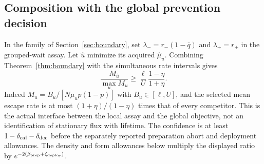 \documentclass[11pt,a4paper]{article}
\begin{document}
\subsection{Composition with the global prevention decision}
In the family of Section~\ref{sec:boundary}, set
$\lambda_-=r_-(1-\bar q)$ and $\lambda_+=r_+$ in the grouped-wait assay.
Let $\widehat u$ minimize its acquired $\widehat\mu_u$. Combining
Theorem~\ref{thm:boundary} with the simultaneous rate intervals gives
\begin{equation}
 \frac{M_{\widehat u}}{\max_uM_u}
 \ge \frac\ell U\frac{1-\eta}{1+\eta}.
 \label{eq:groupedglobal}
\end{equation}
Indeed $M_u=B_u/[N\mu_u p(1-p)]$ with $B_u\in[\ell,U]$,
and the selected mean escape rate is at most $(1+\eta)/(1-\eta)$
times that of every competitor. This is the actual interface between
the local assay and the global objective, not an identification of
stationary flux with lifetime. The confidence is at least
$1-\delta_{\rm cal}-\delta_{\rm dec}$ before the separately reported
preparation abort and deployment allowances. The density and form
allowances below multiply the displayed ratio by
$e^{-2(\beta_{\rm prep}+\zeta_{\rm deploy})}$.
\end{document}

